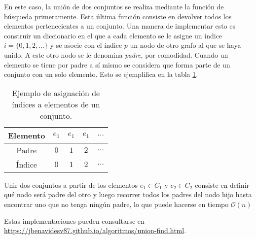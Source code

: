 \documentclass[paper=leter, fontsize=11pt]{scrartcl}
\numberwithin{equation}{section}		%
\numberwithin{figure}{section}			%
\numberwithin{table}{section}				%
\begin{document}
En este caso, la unión de dos conjuntos se realiza mediante la función de búsqueda primeramente. Esta última función consiste en devolver todos los elementos pertenecientes a un conjunto. Una manera de implementar esto es construir un diccionario en el que a cada elemento se le asigne un índice $i = \{0, 1, 2, \ldots\}$ y se asocie con el índice $p$ un nodo de otro grafo al que se haya unido. A este otro nodo se le denomina \textit{padre}, por comodidad. Cuando un elemento se tiene por padre a sí mismo se considera que forma parte de un conjunto con un solo elemento. Esto se ejemplifica en la tabla \ref{asignacion}.

\begin{table}[]
    \centering
    \caption{Ejemplo de asignación de índices a elementos de un conjunto.}
    \label{asignacion}
    \begin{tabular}{@{}ccccc@{}}
    \toprule
    Elemento & $e_1$ & $e_1$ & $e_1$ & $\ldots$ \\ \midrule
    Padre   & $0$     & $1$     & $2$     & $\ldots$ \\ \bottomrule
    Índice   & $0$     & $1$     & $2$     & $\ldots$ \\ \bottomrule
    \end{tabular}
\end{table}

Unir dos conjuntos a partir de los elementos $e_1 \in C_1$ y $e_2 \in C_2$ consiste en definir qué nodo será padre del otro y luego recorrer todos los padres del nodo hijo hasta encontrar uno que no tenga ningún padre, lo que puede hacerse en tiempo $\mathcal{O}(n)$

Estas implementaciones pueden consultarse en \url{https://jbenavidesv87.github.io/algoritmos/union-find.html}.



\end{document}
